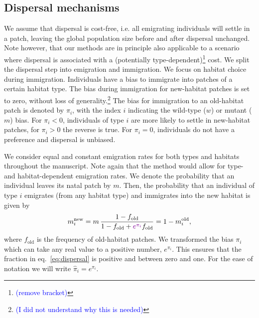 \documentclass[a4paper,11pt]{article}
\newcommand{\francois}[1]{\textcolor{blue}{(#1)}}
\newcommand{\chg}[1]{\textcolor{change}{#1}}
\begin{document}
\subsection*{Dispersal mechanisms}

We assume that dispersal is cost-free, i.e. all emigrating individuals will settle in a patch, leaving the global population size before and after dispersal unchanged. \chg{Note however, that our methods are in principle also applicable to a scenario where dispersal is associated with a (potentially type-dependent)\footnote{\francois{remove bracket}} cost.} We split the dispersal step into emigration and immigration. We focus on habitat choice during immigration. Individuals have a bias to immigrate into patches of a certain habitat type. The bias \chg{during} immigration \chg{for} new-habitat patches is set to \chg{zero}, without loss of generality.\footnote{\francois{I did not understand why this is needed}} The bias \chg{for immigration to} an old-habitat patch is denoted by $\pi_{i}$, with the index $i$ indicating the wild-type ($w$) or mutant ($m$) bias. For \chg{$\pi_i<0$}, individuals of type $i$ are more likely to settle in new-habitat patches, for \chg{$\pi_i>0$} the reverse is true. For $\pi_i=0$, individuals do not have a preference and dispersal is \chg{unbiased}.

We consider equal and constant emigration rates for both types and habitats throughout the manuscript. Note again that the method would allow for type- and habitat-dependent emigration rates. We denote the probability \chg{that an individual leaves} its natal patch by $m$. 
Then, the probability \chg{that an individual of type $i$} \chg{emigrates (from any habitat type) and immigrates into }the new habitat is given by 
\begin{equation}\label{eq:dispersal}
\begin{aligned}
m_i^{\text{new}} &= m\, \frac{1-f_{\text{old}}}{1-f_{\text{old}}+\chg{e^{\pi_i}} f_{\text{old}}} = 1-m_i^{\text{old}},\\
\end{aligned}
\end{equation}
where $f_{\text{old}}$ is the frequency of old-habitat patches. \chg{
	We transformed the bias $\pi_i$ which can take any real value to a positive number, $e^{\pi_i}$. This ensures that the fraction in eq.~\eqref{eq:dispersal} is positive and between zero and one. For the ease of notation we will write $\widehat{\pi}_i=e^{\pi_i}$.}
\end{document}
